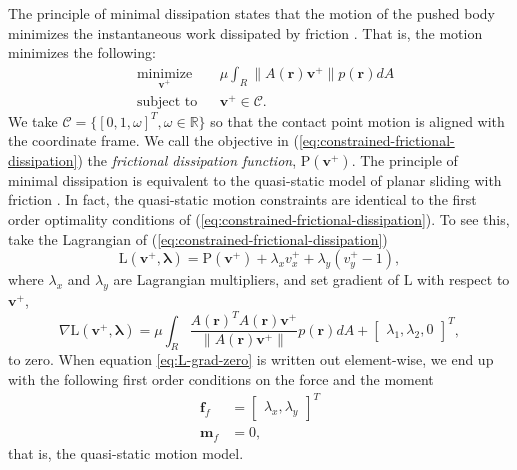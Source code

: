 \documentclass[conference]{IEEEtran}
\newcommand{\BB}[1]{{\color{red} {Byron: {#1}}}}
\begin{document}
The principle of minimal dissipation states that the motion of the
pushed body minimizes the instantaneous work dissipated by friction
\cite{alexander1993bounds}. That is, the motion minimizes the
following: 
\begin{equation} \begin{aligned}
& \underset{\mathbf{v}^+}{\text{minimize}}
& & \mu\int_R\lVert A(\mathbf{r})\mathbf{v}^+ \rVert p(\mathbf{r}) dA \\
& \text{subject to}
& & \mathbf{v}^+ \in \mathcal{C}.
\end{aligned} \label{eq:constrained-frictional-dissipation}
\end{equation}
We take $\mathcal{C} = \{[0,1,\omega]^T, \omega \in \mathbb{R}\}$ so
that the contact point motion is aligned with the coordinate frame. We
call the objective in (\ref{eq:constrained-frictional-dissipation})
the \textit{frictional dissipation function},
$\mathrm{P}(\mathbf{v}^+)$. The principle of minimal dissipation is
equivalent to the quasi-static model of planar sliding with friction
\cite{alexander1993bounds}.  In fact, the quasi-static motion
constraints are identical to the first order optimality conditions of
(\ref{eq:constrained-frictional-dissipation}). To see this, take the
Lagrangian of (\ref{eq:constrained-frictional-dissipation})
\begin{equation}
  \mathrm{L}(\mathbf{v}^+,\mathbf{\lambda}) = \mathrm{P}(\mathbf{v}^+) + \lambda_xv^+_x + \lambda_y(v^+_y-1),
\end{equation}
where $\lambda_x$ and $\lambda_y$ are Lagrangian multipliers, and set
gradient of $\mathrm{L}$ with respect to $\mathbf{v}^+$,
\begin{equation}
  \nabla\mathrm{L}(\mathbf{v}^+,\mathbf{\lambda}) = \mu\int_R\frac{A(\mathbf{r})^TA(\mathbf{r})\mathbf{v}^+}{\lVert A(\mathbf{r})\mathbf{v}^+ \rVert} p(\mathbf{r}) dA + \begin{bmatrix}\lambda_1, \lambda_2, 0\end{bmatrix}^T, \label{eq:L-grad-zero}
\end{equation}
to zero. When equation \ref{eq:L-grad-zero} is written out
element-wise, we end up with the following first order conditions on
the force and the moment %
\begin{align}
  \mathbf{f}_f &= \begin{bmatrix}\lambda_x, \lambda_y\end{bmatrix}^T\\
  \mathbf{m}_f &= 0,
\end{align}
that is, the quasi-static motion model.
\end{document}
